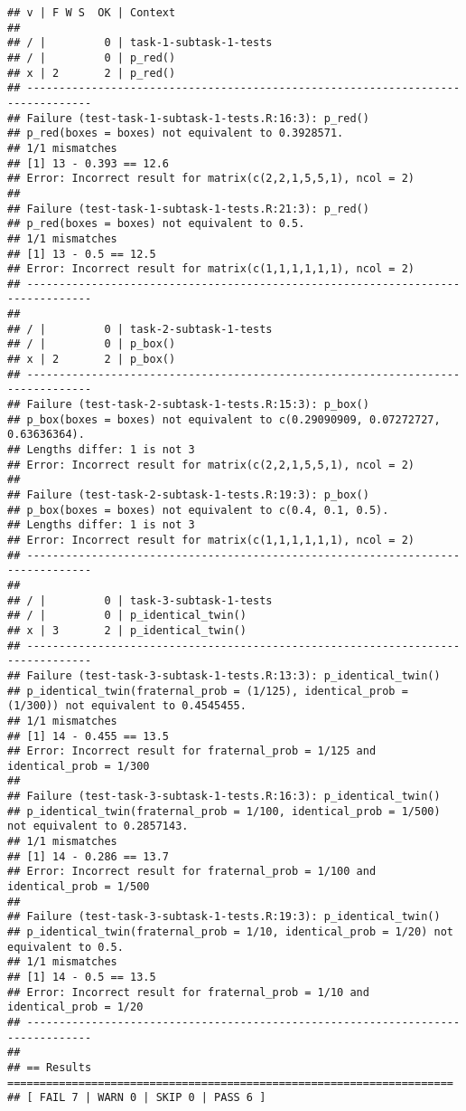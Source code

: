 \documentclass[
]{article}
\begin{document}
\begin{verbatim}
## v | F W S  OK | Context
## 
## / |         0 | task-1-subtask-1-tests                                          
## / |         0 | p_red()                                                         
## x | 2       2 | p_red()
## --------------------------------------------------------------------------------
## Failure (test-task-1-subtask-1-tests.R:16:3): p_red()
## p_red(boxes = boxes) not equivalent to 0.3928571.
## 1/1 mismatches
## [1] 13 - 0.393 == 12.6
## Error: Incorrect result for matrix(c(2,2,1,5,5,1), ncol = 2)
## 
## Failure (test-task-1-subtask-1-tests.R:21:3): p_red()
## p_red(boxes = boxes) not equivalent to 0.5.
## 1/1 mismatches
## [1] 13 - 0.5 == 12.5
## Error: Incorrect result for matrix(c(1,1,1,1,1,1), ncol = 2)
## --------------------------------------------------------------------------------
## 
## / |         0 | task-2-subtask-1-tests                                          
## / |         0 | p_box()                                                         
## x | 2       2 | p_box()
## --------------------------------------------------------------------------------
## Failure (test-task-2-subtask-1-tests.R:15:3): p_box()
## p_box(boxes = boxes) not equivalent to c(0.29090909, 0.07272727, 0.63636364).
## Lengths differ: 1 is not 3
## Error: Incorrect result for matrix(c(2,2,1,5,5,1), ncol = 2)
## 
## Failure (test-task-2-subtask-1-tests.R:19:3): p_box()
## p_box(boxes = boxes) not equivalent to c(0.4, 0.1, 0.5).
## Lengths differ: 1 is not 3
## Error: Incorrect result for matrix(c(1,1,1,1,1,1), ncol = 2)
## --------------------------------------------------------------------------------
## 
## / |         0 | task-3-subtask-1-tests                                          
## / |         0 | p_identical_twin()                                              
## x | 3       2 | p_identical_twin()
## --------------------------------------------------------------------------------
## Failure (test-task-3-subtask-1-tests.R:13:3): p_identical_twin()
## p_identical_twin(fraternal_prob = (1/125), identical_prob = (1/300)) not equivalent to 0.4545455.
## 1/1 mismatches
## [1] 14 - 0.455 == 13.5
## Error: Incorrect result for fraternal_prob = 1/125 and identical_prob = 1/300
## 
## Failure (test-task-3-subtask-1-tests.R:16:3): p_identical_twin()
## p_identical_twin(fraternal_prob = 1/100, identical_prob = 1/500) not equivalent to 0.2857143.
## 1/1 mismatches
## [1] 14 - 0.286 == 13.7
## Error: Incorrect result for fraternal_prob = 1/100 and identical_prob = 1/500
## 
## Failure (test-task-3-subtask-1-tests.R:19:3): p_identical_twin()
## p_identical_twin(fraternal_prob = 1/10, identical_prob = 1/20) not equivalent to 0.5.
## 1/1 mismatches
## [1] 14 - 0.5 == 13.5
## Error: Incorrect result for fraternal_prob = 1/10 and identical_prob = 1/20
## --------------------------------------------------------------------------------
## 
## == Results =====================================================================
## [ FAIL 7 | WARN 0 | SKIP 0 | PASS 6 ]
\end{verbatim}
\end{document}

